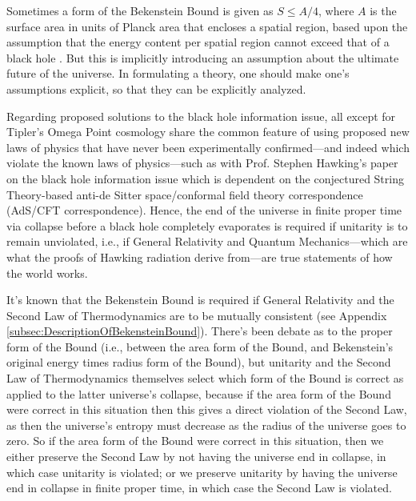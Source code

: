 \documentclass[letterpaper,12pt]{article}
\begin{document}
Sometimes a form of the Bekenstein Bound is given as \( S \leq A/4 \), where \( A \) is the surface area in units of Planck area that encloses a spatial region, based upon the assumption that the energy content per spatial region cannot exceed that of a black hole \cite{Bousso1999-5}. But this is implicitly introducing an assumption about the ultimate future of the universe. In formulating a theory, one should make one's assumptions explicit, so that they can be explicitly analyzed.

Regarding proposed solutions to the black hole information issue, all except for Tipler's Omega Point cosmology share the common feature of using proposed new laws of physics that have never been experimentally confirmed---and indeed which violate the known laws of physics---such as with Prof. Stephen Hawking's paper \cite{Hawking2005} on the black hole information issue which is dependent on the conjectured String Theory-based anti-de Sitter space\slash conformal field theory correspondence (AdS\slash CFT correspondence). Hence, the end of the universe in finite proper time via collapse before a black hole completely evaporates is required if \gls{unitarity} is to remain unviolated, i.e., if General Relativity and Quantum Mechanics---which are what the proofs of Hawking radiation \cite{Hawking1974,Hawking1975,Hawking1976,Parker1975,Wald1975} derive from---are true statements of how the world works.

It's known that the Bekenstein Bound is required if General Relativity and the Second Law of Thermodynamics are to be mutually consistent (see Appendix \ref{subsec:DescriptionOfBekensteinBound}). There's been debate as to the proper form of the Bound (i.e., between the area form of the Bound, and Bekenstein's original energy times radius form of the Bound), but unitarity and the Second Law of Thermodynamics themselves select which form of the Bound is correct as applied to the latter universe's collapse, because if the area form of the Bound were correct in this situation then this gives a direct violation of the Second Law, as then the universe's entropy must decrease as the radius of the universe goes to zero. So if the area form of the Bound were correct in this situation, then we either preserve the Second Law by not having the universe end in collapse, in which case unitarity is violated; or we preserve unitarity by having the universe end in collapse in finite proper time, in which case the Second Law is violated.
\end{document}
